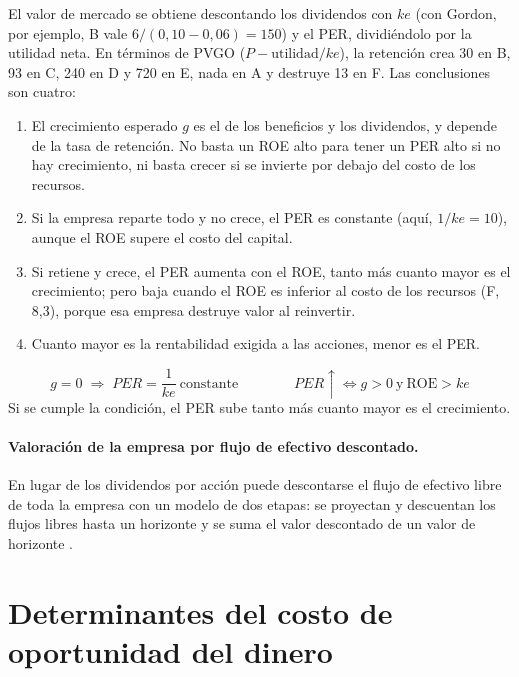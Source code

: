 El valor de mercado se obtiene descontando los dividendos con $ke$ (con Gordon, por ejemplo, B vale $6/(0{,}10-0{,}06) = 150$) y el PER, dividiéndolo por la utilidad neta. En términos de PVGO ($P - \text{utilidad}/ke$), la retención crea 30 en B, 93 en C, 240 en D y 720 en E, nada en A y destruye 13 en F. Las conclusiones son cuatro:
\begin{enumerate}
\item El crecimiento esperado $g$ es el de los beneficios y los dividendos, y depende de la tasa de retención. No basta un ROE alto para tener un PER alto si no hay crecimiento, ni basta crecer si se invierte por debajo del costo de los recursos.
\item Si la empresa reparte todo y no crece, el PER es constante (aquí, $1/ke = 10$), aunque el ROE supere el costo del capital.
\item Si retiene y crece, el PER aumenta con el ROE, tanto más cuanto mayor es el crecimiento; pero baja cuando el ROE es inferior al costo de los recursos (F, 8,3), porque esa empresa destruye valor al reinvertir.
\item Cuanto mayor es la rentabilidad exigida a las acciones, menor es el PER.
\end{enumerate}

\begin{formulaBox}
\[
g = 0 \;\Longrightarrow\; PER = \frac{1}{ke}\ \text{constante}
\qquad\qquad
PER\uparrow \iff g > 0 \ \text{y}\ \text{ROE} > ke
\]
Si se cumple la condición, el PER sube tanto más cuanto mayor es el crecimiento.
\end{formulaBox}

\paragraph{Valoración de la empresa por flujo de efectivo descontado.} En lugar de los dividendos por acción puede descontarse el flujo de efectivo libre de toda la empresa con un modelo de dos etapas: se proyectan y descuentan los flujos libres hasta un horizonte y se suma el valor descontado de un valor de horizonte .

\section{Determinantes del costo de oportunidad del dinero}\label{sec:u4-costooport}

